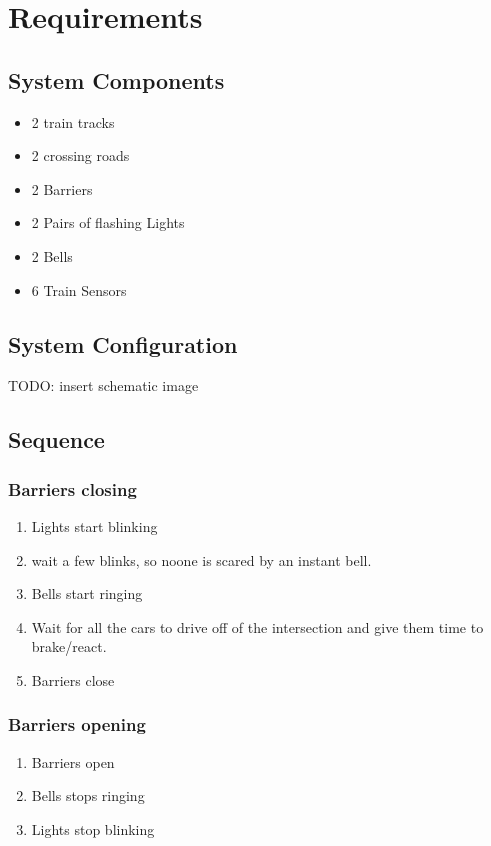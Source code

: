 \documentclass[final]{report} %
\begin{document}
\chapter{Requirements}

\section{System Components}
\begin{itemize}
\item 2 train tracks
\item 2 crossing roads
\item 2 Barriers
\item 2 Pairs of flashing Lights
\item 2 Bells
\item 6 Train Sensors
\end{itemize}
\section{System Configuration}
TODO: insert schematic image
\section{Sequence}

\subsection{Barriers closing}
\begin{enumerate}
\item Lights start blinking
\item wait a few blinks, so noone is scared by an instant bell. %
\item Bells start ringing
\item Wait for all the cars to drive off of the intersection and give them time to brake/react.
\item Barriers close
\end{enumerate}

\subsection{Barriers opening}
\begin{enumerate}
\item Barriers open
\item Bells stops ringing
\item Lights stop blinking
\end{enumerate}
\end{document}
